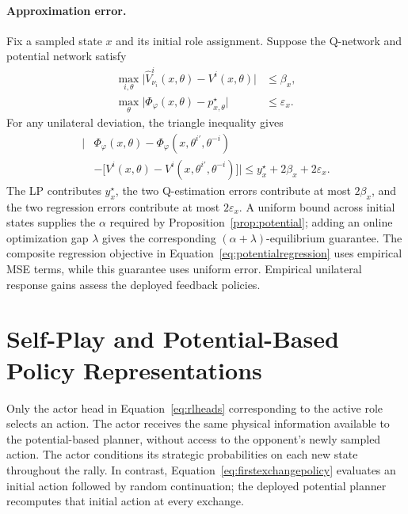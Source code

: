 \documentclass[pmlr]{jmlr}
\begin{document}
\paragraph{Approximation error.}
Fix a sampled state $x$ and its initial role assignment. Suppose the Q-network and potential network satisfy
\begin{equation}
\begin{aligned}
 \max_{i,\theta}\big|\widehat V^i_{\nu_i}(x,\theta)-V^i(x,\theta)\big|&\leq\beta_x,\\
 \max_\theta\big|\Phi_\varphi(x,\theta)-p_{x,\theta}^\star\big|&\leq\varepsilon_x.
\end{aligned}
 \label{eq:estimationerrors}
\end{equation}
For any unilateral deviation, the triangle inequality gives
\begin{equation}
\begin{aligned}
 \big|&\Phi_\varphi(x,\theta)-\Phi_\varphi(x,\theta^{i\prime},\theta^{-i})\\
 &-\big[V^i(x,\theta)-V^i(x,\theta^{i\prime},\theta^{-i})\big]\big|
 \leq y_x^\star+2\beta_x+2\varepsilon_x.
\end{aligned}
 \label{eq:twostageerror}
\end{equation}
The LP contributes $y_x^\star$, the two Q-estimation errors contribute at most $2\beta_x$, and the two regression errors contribute at most $2\varepsilon_x$. A uniform bound across initial states supplies the $\alpha$ required by Proposition~\ref{prop:potential}; adding an online optimization gap $\lambda$ gives the corresponding $(\alpha+\lambda)$-equilibrium guarantee. The composite regression objective in Equation~\eqref{eq:potentialregression} uses empirical MSE terms, while this guarantee uses uniform error. Empirical unilateral response gains assess the deployed feedback policies.

\section{Self-Play and Potential-Based Policy Representations}
\label{app:selfplay}
Only the actor head in Equation~\eqref{eq:rlheads} corresponding to the active role selects an action. The actor receives the same physical information available to the potential-based planner, without access to the opponent's newly sampled action. The actor conditions its strategic probabilities on each new state throughout the rally. In contrast, Equation~\eqref{eq:firstexchangepolicy} evaluates an initial action followed by random continuation; the deployed potential planner recomputes that initial action at every exchange.
\end{document}
